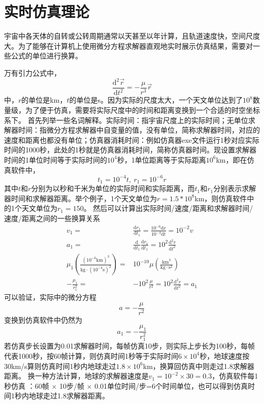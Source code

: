 \section{实时仿真理论}
宇宙中各天体的自转或公转周期通常以天甚至以年计算，且轨道速度快，空间尺度大。为了能够在计算机上使用微分方程求解器\cite{olzhn2021}直观地实时展示仿真结果，需要对一些公式的单位进行换算。\par
万有引力公式中，
$$\frac{\text{d}^2\vec{r}}{\text{d}t^2}=-\frac{\mu}{r^3}\vec{r}$$
中，$r$的单位是km，$t$的单位是s。因为实际的尺度太大，一个天文单位达到了$10^8$数量级，为了便于仿真，需要将实际尺度中的时间和距离变换到一个合适的时空坐标系下。
首先列举一些名词解释。实际时间：指宇宙尺度上的实际时间；无单位求解器时间：指微分方程求解器中自变量的值，没有单位，简称求解器时间，对应的速度和距离也都没有单位；仿真器消耗时间：例如仿真器exe文件运行1秒对应实际时间的1000秒，此处的1秒就是仿真器消耗时间，简称仿真器时间。现设置求解器时间的1单位时间等于实际时间的$10^4$秒，1单位距离等于实际距离$10^6$km，即在仿真软件中，
$$t_1=10^{-4}t,\ r_1=10^{-6}r$$
其中$t$和$r$分别为以秒和千米为单位的实际时间和实际距离，而$t_1$和$r_1$分别表示求解器时间和求解器距离。举个例子，1个天文单位为$r=1.5*10^8$km，则仿真软件中的1个天文单位为$r_1=150$。
然后可以计算出实际时间/速度/距离和求解器时间/速度/距离之间的一些换算关系
$$\begin{aligned}
v_1 =& \frac{\text{d}r_1}{\text{d}t_1}
 = \frac{10^{-6}\text{d}r}{10^{-4}\text{d}t} = 10^{-2}v \\
a_1 =& \frac{\text{d}}{\text{d}t_1}\frac{\text{d}r_1}{\text{d}t_1}
 = 10^2\frac{\text{d}^2r}{\text{d}t^2} \\
\mu_1(\frac{(10^{-6}\text{km})^3}{\text{kg}\cdot(10^{-4}\text{s})^2})
 =& 10^{-10}\mu(\frac{\text{km}^3}{\text{kg}\cdot \text{s}^2}) \\
-\frac{\mu_1}{r_1^2} =& -10^2\frac{\mu}{r^2} = 10^2\frac{\text{d}^2r}{\text{d}t^2} = a_1
\end{aligned}$$
可以验证，实际中的微分方程
$$a=-\frac{\mu}{r^2}$$
变换到仿真软件中仍然为
$$a_1=-\frac{\mu_1}{r_1^2}$$
若仿真步长设置为0.01求解器时间，每帧仿真10步，则实际上步长为100秒，每帧代表1000秒，按60帧计算，则仿真时间1秒等于实际时间$6\times10^4$秒，地球速度按30km/s算则仿真时间1秒内地球走过$1.8\times10^6$km，换算回仿真中则走过1.8求解器距离。
换一种方法计算，地球的求解器速度是$v_1=10^{-2}\times30=0.3$，仿真软件每1秒仿真 ：60帧 $\times$ 10步/帧 $\times$ 0.01单位时间/步=6个时间单位，也可以得到仿真时间1秒内地球走过1.8求解器距离。

